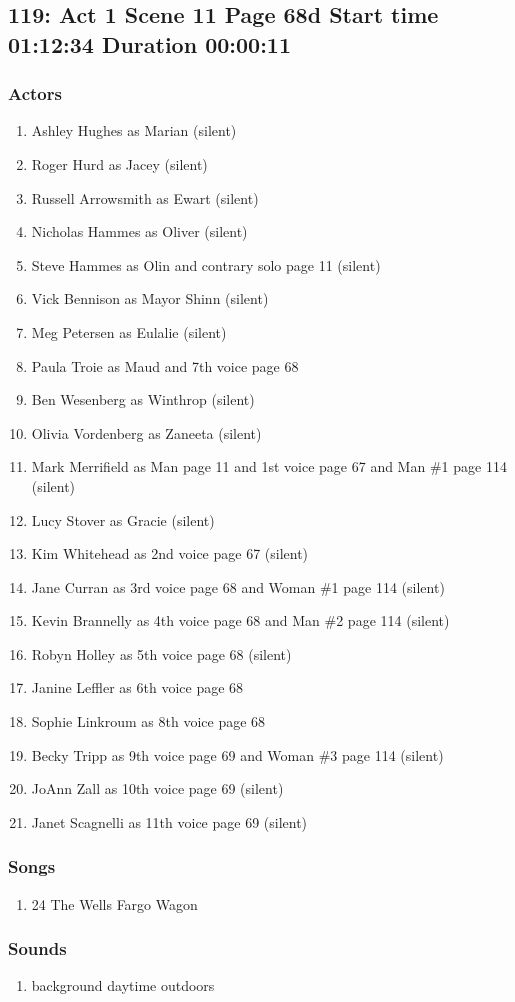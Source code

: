 \subsection{119: Act 1 Scene 11 Page 68d Start time 01:12:34 Duration 00:00:11}

\subsubsection{Actors}
\begin{enumerate}
\item Ashley Hughes as Marian (silent)
\item Roger Hurd as Jacey (silent)
\item Russell Arrowsmith as Ewart (silent)
\item Nicholas Hammes as Oliver (silent)
\item Steve Hammes as Olin and contrary solo page 11 (silent)
\item Vick Bennison as Mayor Shinn (silent)
\item Meg Petersen as Eulalie (silent)
\item Paula Troie as Maud and 7th voice page 68
\item Ben Wesenberg as Winthrop (silent)
\item Olivia Vordenberg as Zaneeta (silent)
\item Mark Merrifield as Man page 11 and 1st voice page 67 and Man \#1 page 114 (silent)
\item Lucy Stover as Gracie (silent)
\item Kim Whitehead as 2nd voice page 67 (silent)
\item Jane Curran as 3rd voice page 68 and Woman \#1 page 114 (silent)
\item Kevin Brannelly as 4th voice page 68 and Man \#2 page 114 (silent)
\item Robyn Holley as 5th voice page 68 (silent)
\item Janine Leffler as 6th voice page 68
\item Sophie Linkroum as 8th voice page 68
\item Becky Tripp as 9th voice page 69 and Woman \#3 page 114 (silent)
\item JoAnn Zall as 10th voice page 69 (silent)
\item Janet Scagnelli as 11th voice page 69 (silent)
\end{enumerate}

\subsubsection{Songs}
\begin{enumerate}
\item 24 The Wells Fargo Wagon
\end{enumerate}\subsubsection{Sounds}
\begin{enumerate}
\item background daytime outdoors
\end{enumerate}
